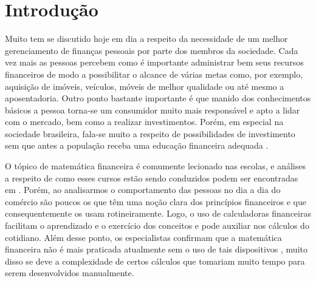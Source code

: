 \chapter{Introdução}




Muito tem se discutido hoje em dia a respeito da necessidade de um melhor gerenciamento de finanças pessoais por parte dos membros da sociedade. Cada vez mais as pessoas percebem como é importante administrar bem seus recursos financeiros de modo a possibilitar o alcance de várias metas como, por exemplo, aquisição de imóveis, veículos, móveis de melhor qualidade ou até mesmo a aposentadoria. Outro ponto bastante importante é que manido dos conhecimentos básicos a pessoa torna-se um consumidor muito mais responsável e apto a lidar com o mercado, bem como a realizar investimentos. Porém, em especial na sociedade brasileira, fala-se muito a respeito de possibilidades de investimento sem que antes a população receba uma educação financeira adequada \cite{valoreducacao}. 

O tópico de matemática financeira é comumente lecionado nas escolas, e análises a respeito de como esses cursos estão sendo conduzidos podem ser encontradas em \cite{educacaoMedio}. Porém, ao analisarmos o comportamento das pessoas no dia a dia do comércio são poucos os que têm uma noção clara dos princípios financeiros e que consequentemente os usam rotineiramente. Logo, o uso de calculadoras financeiras facilitam o aprendizado e o exercício dos conceitos e pode auxiliar nos cálculos do cotidiano. Além desse ponto, os especialistas confirmam que a matemática financeira não é mais praticada atualmente sem o uso de tais dispositivos \cite{matFinanceira}, muito disso se deve a complexidade de certos cálculos que tomariam muito tempo para serem desenvolvidos manualmente.

